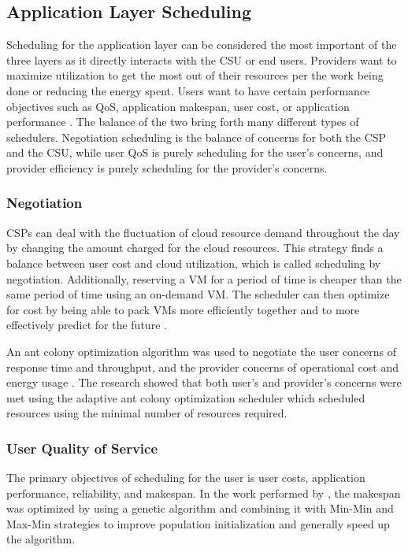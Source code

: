 \documentclass[12pt]{article}
\begin{document}
\subsection{Application Layer Scheduling} \label{sub:appl-sched}

Scheduling for the application layer can be considered the most important of the three layers as it directly interacts with the CSU or end users. Providers want to maximize utilization to get the most out of their resources per the work being done or reducing the energy spent. Users want to have certain performance objectives such as QoS, application makespan, user cost, or application performance \cite{zhan2015cloud,Jennings2015}. The balance of the two bring forth many different types of schedulers. Negotiation scheduling is the balance of concerns for both the CSP and the CSU, while user QoS is purely scheduling for the user's concerns, and provider efficiency is purely scheduling for the provider's concerns.


\subsubsection{Negotiation}

CSPs can deal with the fluctuation of cloud resource demand throughout the day by changing the amount charged for the cloud resources. This strategy finds a balance between user cost and cloud utilization, which is called scheduling by negotiation. Additionally, reserving a VM for a period of time is cheaper than the same period of time using an on-demand VM. The scheduler can then optimize for cost by being able to pack VMs more efficiently together and to more effectively predict for the future \cite{chaisiri2012optimization}.

An ant colony optimization algorithm was used to negotiate the user concerns of response time and throughput, and the provider concerns of operational cost and energy usage \cite{chimakurthi2011power}. The research showed that both user's and provider's concerns were met using the adaptive ant colony optimization scheduler which scheduled resources using the minimal number of resources required.




\subsubsection{User Quality of Service}

The primary objectives of scheduling for the user is user costs, application performance, reliability, and makespan. In the work performed by \cite{kumar2012independent}, the makespan was optimized by using a genetic algorithm and combining it with Min-Min and Max-Min strategies to improve population initialization and generally speed up the algorithm.
\end{document}
